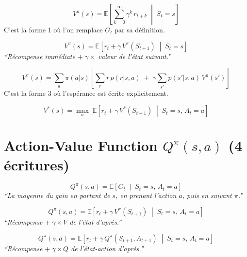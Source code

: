 \documentclass[11pt,a4paper]{article}
\newcommand{\E}{\mathbb{E}}
\begin{document}
\begin{formbox}
$$V^\pi(s) = \E\left[\sum_{k=0}^{\infty} \gamma^k \, r_{t+k} \;\middle|\; S_t = s\right]$$
C'est la forme 1 où l'on remplace $G_t$ par sa définition.
\end{formbox}

\begin{formbox}
$$\boxed{V^\pi(s) = \E\left[r_t + \gamma \, V^\pi(S_{t+1}) \;\middle|\; S_t = s\right]}$$
\textit{``Récompense immédiate $+\;\gamma \times$ valeur de l'état suivant.''}
\end{formbox}

\begin{formbox}
$$V^\pi(s) = \sum_{a} \pi(a|s) \left[\sum_{r} r \, p(r|s,a) \;+\; \gamma \sum_{s'} p(s'|s,a) \, V^\pi(s')\right]$$
C'est la forme 3 où l'espérance est écrite explicitement.
\end{formbox}

\begin{formbox}
$$\boxed{V^*(s) = \max_a \; \E\left[r_t + \gamma \, V^*(S_{t+1}) \;\middle|\; S_t = s, \, A_t = a\right]}$$
\end{formbox}

\section{Action-Value Function $Q^\pi(s,a)$ (4 écritures)}

\begin{formbox}
$$\boxed{Q^\pi(s,a) = \E\left[G_t \;\middle|\; S_t = s, \, A_t = a\right]}$$
\textit{``La moyenne du gain en partant de $s$, en prenant l'action $a$, puis en suivant $\pi$.''}
\end{formbox}

\begin{formbox}
$$Q^\pi(s,a) = \E\left[r_t + \gamma \, V^\pi(S_{t+1}) \;\middle|\; S_t = s, \, A_t = a\right]$$
\textit{``Récompense $+\;\gamma \times V$ de l'état d'après.''}
\end{formbox}

\begin{formbox}
$$\boxed{Q^\pi(s,a) = \E\left[r_t + \gamma \, Q^\pi(S_{t+1}, A_{t+1}) \;\middle|\; S_t = s, \, A_t = a\right]}$$
\textit{``Récompense $+\;\gamma \times Q$ de l'état-action d'après.''}
\end{formbox}
\end{document}
